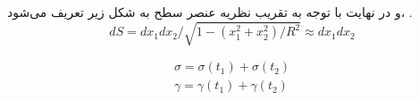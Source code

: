 و در نهایت با توجه به تقریب نظریه عنصر سطح به شکل زیر تعریف می‌شود،
\cite{Helfrich1973}.
\begin{equation}
dS=dx_1dx_2/\sqrt{1-(x_1^2+x_2^2)/R^2}\approx dx_1dx_2
\label{eq:nelsonS8.1}
\end{equation}







\begin{equation}
\begin{aligned}
\sigma=\sigma(t_1)+\sigma(t_2) \\
\gamma=\gamma(t_1)+\gamma(t_2)
\end{aligned}
\end{equation}

% 
%


	        
	       